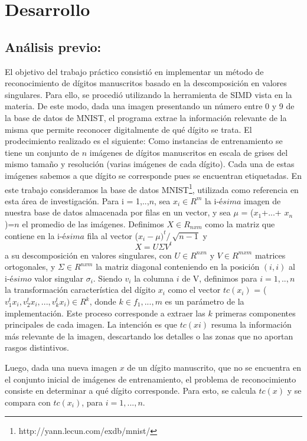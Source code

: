 \documentclass[10pt, a4paper]{article}
\begin{document}
\section{Desarrollo}

\subsection{Análisis previo:}

El objetivo del trabajo práctico consistió en implementar un método de reconocimiento de dígitos manuscritos basado en la descomposición en valores singulares. Para ello, se procedió utilizando la herramienta de SIMD vista en la materia. De este modo, dada una imagen presentando un número entre 0 y 9 de la base de datos de MNIST, el programa extrae la información relevante de la misma que permite reconocer digitalmente de qué dígito se trata. El prodecimiento realizado es el siguiente:
Como instancias de entrenamiento se tiene un conjunto de $n$ imágenes de dígitos manuscritos en escala de grises del mismo tamaño y resolución (varias imágenes de cada dígito). Cada una de estas imágenes sabemos a que dígito se corresponde pues se encuentran etiquetadas. En este trabajo consideramos la base de datos MNIST\footnote{http://yann.lecun.com/exdb/mnist/}, utilizada como referencia en esta área de investigación. Para i = 1,..,$n$, sea $x_{i} \in R^{m}$ la i-$ésima$ imagen de nuestra base de datos almacenada por filas en un vector, y sea $\mu$ = ($x_{1}$+...+ $x_{n}$)=$n$ el promedio de las imágenes. Definimos $X \in R_{nxm}$ como la matriz que contiene en la i-$ésima$ fila al vector ($x_{i} - \mu)^t /\ \sqrt{n-1}$ y $$X = U \Sigma V^t$$
a su descomposición en valores singulares, con $U \in R^{nxn}$ y $V \in R^{mxm}$ matrices ortogonales, y $\Sigma \in R^{nxm}$ la matriz diagonal conteniendo en la posición $(i, i)$ al i-$ésimo$ valor singular $\sigma_i$.
Siendo $v_i$ la columna $i$ de V, definimos para $i = 1,..,n$ la transformación característica del dígito $x_i$ como el vector $tc(x_i)$ = ($v_1^t
x_i, v_2^t x_i,..., v_k^t x_i) \in R^k$, donde $k \in f_1,...,m$ es un parámetro de la implementación. Este proceso corresponde a extraer las $k$ primeras componentes principales de cada imagen. La intención es que $tc(xi)$ resuma la información más relevante de la imagen, descartando los detalles o las zonas que no aportan rasgos distintivos.

Luego, dada una nueva imagen $x$ de un dígito manuscrito, que no se encuentra en el conjunto inicial de imágenes de entrenamiento, el problema de reconocimiento consiste en determinar a qué dígito corresponde. Para esto, se calcula $tc(x)$ y se compara con $tc(x_i)$, para $i = 1,...,n$.
\end{document}
